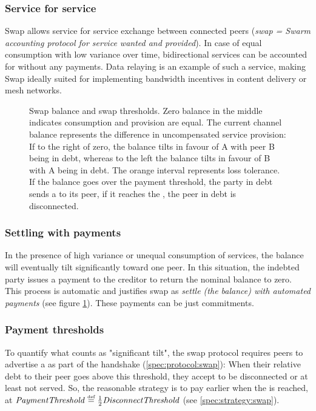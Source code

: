 \subsubsection{Service for service}

Swap allows service for service exchange between connected peers (\emph{swap = Swarm accounting protocol for service wanted and provided}). In case of equal consumption with low variance over time, bidirectional services can be accounted for without any payments. Data relaying is an example of such a service, making Swap ideally suited for implementing bandwidth incentives in content delivery or mesh networks.

\begin{figure}[htbp]

\caption[Swap balance and swap thresholds \statusgreen]{Swap balance and swap thresholds.
Zero balance in the middle indicates consumption and provision are equal.
The current channel balance represents the difference in uncompensated service provision:
If to the right of zero, the balance tilts in favour of A with peer B being in debt, whereas to the left
the balance tilts in favour of B with A being in debt.
The orange interval represents loss tolerance. If the balance goes over the payment threshold, the party in
debt sends a  to its peer, if it reaches the , the peer in debt is disconnected.}
\label{fig:swap}
\end{figure}

\subsubsection{Settling with payments}

In the presence of high variance or unequal consumption of services, the balance will eventually tilt significantly toward one peer. In this situation, the indebted party issues a payment to the creditor to return the nominal balance to zero. This process is automatic and justifies swap as \emph{settle (the balance) with automated payments} (see figure \ref{fig:swap}). These payments can be just commitments.


\subsubsection{Payment thresholds}

To quantify what counts as "significant tilt", the swap protocol requires peers to advertise a  as part of the handshake (\ref{spec:protocol:swap}): When their relative debt to their peer goes above this threshold, they accept to be disconnected or at least not served. So, the reasonable strategy is to pay earlier when the  is reached, at $\mathit{PaymentThreshold}\overset{\textrm{\tiny def}}{=}\frac{1}{2}\mathit{DisconnectThreshold}$ (see \ref{spec:strategy:swap}). 



